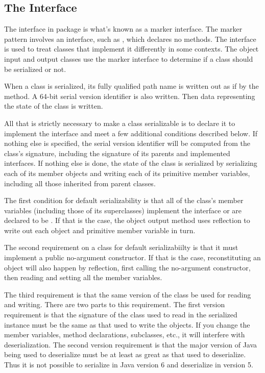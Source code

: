 \subsection{The  Interface}

The  interface in package  is 
what's known as a marker interface.  The marker pattern involves
an interface, such as , which declares no
methods.  The interface is used to treat classes that implement
it differently in some contexts.  The object input and output
classes use the  marker interface to determine
if a class should be serialized or not.  

When a class is serialized, its fully qualified path name is written
out as if by the  method.  A 64-bit serial version
identifier is also written.  Then data representing the state of
the class is written.

All that is strictly necessary to make a class serializable is to
declare it to implement the  interface and meet a
few additional conditions described below.  If nothing else is
specified, the serial version identifier will be computed from the
class's signature, including the signature of its parents and
implemented interfaces.  If nothing else is done, the state of the
class is serialized by serializing each of its member objects and
writing each of its primitive member variables, including all those
inherited from parent classes.

The first condition for default serializability is that all of the
class's member variables (including those of its superclasses)
implement the  interface or are declared to be
.  If that is the case, the object output method uses
reflection to write out each object and primitive member variable in
turn.  

The second requirement on a class for default serializabiilty is that
it must implement a public no-argument constructor.  If that is the
case, reconstituting an object will also happen by reflection, first
calling the no-argument constructor, then reading and setting all the
member variables.

The third requirement is that the same version of the class be used
for reading and writing.  There are two parts to this requirement.
The first version requirement is that the signature of the class used
to read in the serialized instance must be the same as that used to
write the objects.  If you change the member variables, method
declarations, subclasses, etc., it will interfere with
deserialization.  The second version requirement is that the major
version of Java being used to deserialize must be at least as great
as that used to deserialize.  Thus it is not possible to serialize in
Java version 6 and deserialize in version 5.


